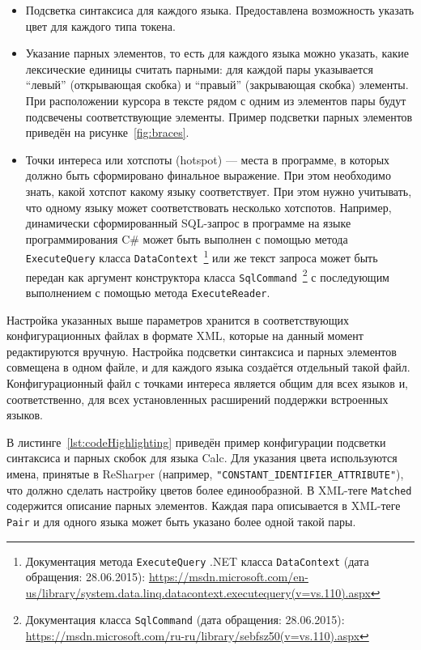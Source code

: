 \begin{itemize}
    \item Подсветка синтаксиса для каждого языка. Предоставлена возможность указать цвет для каждого типа токена.
    \item Указание парных элементов, то есть для каждого языка можно указать, какие лексические единицы считать парными: для каждой пары указывается ``левый'' (открывающая скобка) и ``правый'' (закрывающая скобка) элементы. При расположении курсора в тексте рядом с одним из элементов пары будут подсвечены соответствующие элементы. Пример подсветки парных элементов приведён на рисунке~\ref{fig:braces}.
    \item Точки интереса или хотспоты (hotspot) --- места в программе, в которых должно быть сформировано финальное выражение. При этом необходимо знать, какой хотспот какому языку соответствует. При этом нужно учитывать, что одному языку может соответствовать несколько хотспотов. Например, динамически сформированный SQL-запрос в программе на языке программирования C\# может быть выполнен с помощью метода \verb|ExecuteQuery| класса \verb|DataContext|~\footnote{Документация метода \texttt{ExecuteQuery} .NET класса \texttt{DataContext} (дата обращения: 28.06.2015): \url{https://msdn.microsoft.com/en-us/library/system.data.linq.datacontext.executequery(v=vs.110).aspx}} или же текст запроса может быть передан как аргумент конструктора класса \verb|SqlCommand|~\footnote{Документация класса {\texttt{SqlCommand}} (дата обращения: 28.06.2015): \url{https://msdn.microsoft.com/ru-ru/library/sebfsz50(v=vs.110).aspx}} с последующим выполнением с помощью метода \verb|ExecuteReader|.

\end{itemize}

Настройка указанных выше параметров хранится в соответствующих конфигурационных файлах в формате XML, которые на данный момент редактируются вручную. Настройка подсветки синтаксиса и парных элементов совмещена в одном файле, и для каждого языка создаётся отдельный такой файл. Конфигурационный файл с точками интереса является общим для всех языков и, соответственно, для всех установленных расширений поддержки встроенных языков.

В листинге~\ref{lst:codeHighlighting} приведён пример конфигурации подсветки синтаксиса и парных скобок для языка Calc. Для указания цвета используются имена, принятые в ReSharper (например, \verb|"CONSTANT_IDENTIFIER_ATTRIBUTE"|), что должно сделать настройку цветов более единообразной. В XML-теге \verb|Matched| содержится описание парных элементов. Каждая пара описывается в XML-теге \verb|Pair| и для одного языка может быть указано более одной такой пары.

